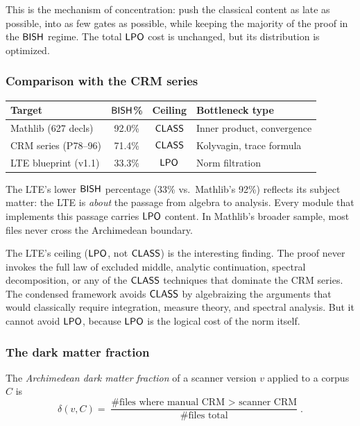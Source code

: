 This is the mechanism of concentration: push the classical content as
late as possible, into as few gates as possible, while keeping the
majority of the proof in the $\textsf{BISH}$ regime.  The total $\textsf{LPO}$ cost
is unchanged, but its distribution is optimized.

\subsubsection{Comparison with the CRM series}\label{sec:comparison}

\begin{center}
\begin{tabular}{lccl}
\toprule
\textbf{Target} & \textbf{$\textsf{BISH}$\%} & \textbf{Ceiling} & \textbf{Bottleneck type} \\
\midrule
Mathlib (627 decls)   & 92.0\% & $\textsf{CLASS}$ & Inner product, convergence \\
CRM series (P78--96)  & 71.4\% & $\textsf{CLASS}$ & Kolyvagin, trace formula \\
LTE blueprint (v1.1)  & 33.3\% & $\textsf{LPO}$  & Norm filtration \\
\bottomrule
\end{tabular}
\end{center}

The LTE's lower $\textsf{BISH}$ percentage (33\% vs.\ Mathlib's 92\%) reflects
its subject matter: the LTE is \emph{about} the passage from algebra
to analysis.  Every module that implements this passage carries $\textsf{LPO}$
content.  In Mathlib's broader sample, most files never cross the
Archimedean boundary.

The LTE's ceiling ($\textsf{LPO}$, not $\textsf{CLASS}$) is the interesting finding.
The proof never invokes the full law of excluded middle, analytic
continuation, spectral decomposition, or any of the $\textsf{CLASS}$
techniques that dominate the CRM series.  The condensed framework
avoids $\textsf{CLASS}$ by algebraizing the arguments that would classically
require integration, measure theory, and spectral analysis.  But it
cannot avoid $\textsf{LPO}$, because $\textsf{LPO}$ is the logical cost of the norm
itself.

\subsubsection{The dark matter fraction}\label{sec:dark-matter-fraction}

\begin{definition}
The \emph{Archimedean dark matter fraction} of a scanner version $v$
applied to a corpus $C$ is
\[
  \delta(v, C) = \frac{\text{\# files where manual CRM $>$ scanner CRM}}{\text{\# files total}}.
\]
\end{definition}

